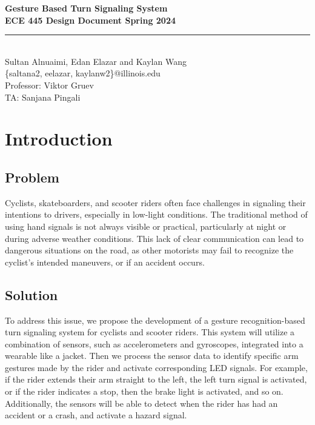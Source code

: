 \documentclass[12pt]{article}
\begin{document}
\begin{titlepage}
\centering
{}
{\LARGE\textbf{Gesture Based Turn Signaling System }}\\[1cm] 
{\large\textbf{ECE 445 Design Document Spring 2024}}\\[0.3cm]
\rule{\textwidth}{1pt}\\
{\Large Sultan Alnuaimi, Edan Elazar and Kaylan Wang}\\[0.5cm] 
{\small \{saltana2, eelazar, kaylanw2\}@illinois.edu}\\[0.5cm] 
{\small Professor: Viktor Gruev}\\[0.5cm]
{\small TA: Sanjana Pingali}\\[1cm]

\end{titlepage} 

\tableofcontents 
\newpage
\section{Introduction}
\subsection{Problem}
Cyclists, skateboarders, and scooter riders often face 
challenges in signaling their intentions to drivers, 
especially in low-light conditions. The traditional
 method of using hand signals is not always visible or 
 practical, particularly at night or during adverse weather 
 conditions. This lack of clear communication can lead to 
 dangerous situations on the road, as other motorists may 
 fail to recognize the cyclist's intended maneuvers, or if 
 an accident occurs. 

\subsection{Solution}

To address this issue, we propose the development of a gesture 
recognition-based turn signaling system for cyclists and scooter 
riders. This system will utilize a combination of sensors, such 
as accelerometers and gyroscopes, integrated into a wearable 
like a jacket. Then we process the sensor data to identify 
specific arm gestures made by the rider and activate corresponding 
LED signals. For example, if the rider extends their arm straight 
to the left, the left turn signal is activated, or if the rider 
indicates a stop, then the brake light is activated, and so on. 
Additionally, the sensors will be able to detect when the rider 
has had an accident or a crash, and activate a hazard signal. 
\end{document}
